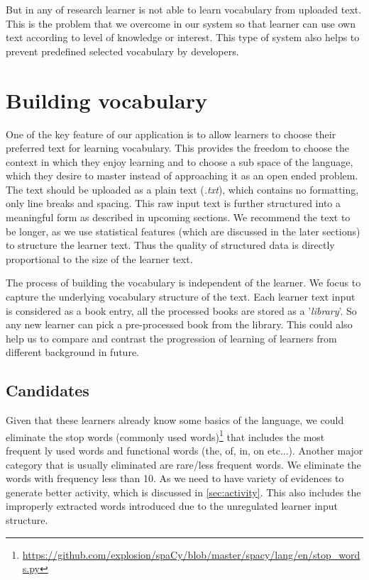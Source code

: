 \documentclass[11pt,a4paper]{article}
\begin{document}
But in any of research learner is not able to learn vocabulary from uploaded text.
This is the problem that we overcome in our system so that learner can use own text
according to level of knowledge or interest. This type of system also helps to prevent predefined selected vocabulary by developers.  

\section{Building vocabulary}
One of the key feature of our application is to allow learners to choose their preferred text for learning vocabulary. This provides the freedom to choose the context in which they enjoy learning and to choose a sub space of the language, which they desire to master instead of approaching it as an open ended problem. The text should be uploaded as a plain text (\textit{.txt}), which contains no formatting, only line breaks and spacing. This raw input text is further structured into a meaningful form as described in upcoming sections. We recommend the text to be longer, as we use statistical features (which are discussed in the later sections) to structure the learner text. Thus the quality of structured data is directly proportional to the size of the learner text.

The process of building the vocabulary is independent of the learner. We focus to capture the underlying vocabulary structure of the text. Each learner text input is considered as a book entry, all the processed books are stored as a '\textit{library}'. So any new learner can pick a pre-processed book from the library. This could also help us to compare and contrast the progression of learning of learners from different background in future.

\subsection{Candidates}

Given that these learners already know some basics of the language, we could eliminate the stop words (commonly used words)\footnote{\url{https://github.com/explosion/spaCy/blob/master/spacy/lang/en/stop_words.py}} that includes the most frequent ly used words and functional words (the, of, in, on etc...). Another major category that is usually eliminated are rare/less frequent words. We eliminate the words with frequency less than 10. As we need to have variety of evidences to generate better activity, which is discussed in \autoref{sec:activity}. 
This also includes the improperly extracted words introduced due to the unregulated learner input structure.
\end{document}
